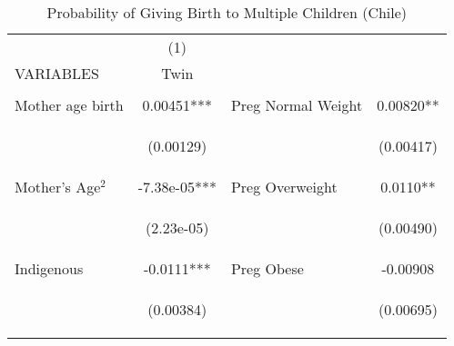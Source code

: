 \begin{table}[htpb!]							
\caption{Probability of Giving Birth to Multiple Children (Chile)}							
\label{tab:twinreg2}							
\begin{center}							
\begin{tabular}{lclc} \toprule							
	&	(1)	&		&		\\
VARIABLES	&	Twin	&		&		\\ \midrule
\vspace{4pt} & \begin{footnotesize}\end{footnotesize} & \begin{footnotesize}\end{footnotesize} & \begin{footnotesize}\end{footnotesize} \\							
Mother age birth	&	0.00451***	&	Preg Normal Weight	&	0.00820**	\\
	\vspace{4pt} & \begin{footnotesize}	(0.00129)	\end{footnotesize} & \begin{footnotesize}		\end{footnotesize} & \begin{footnotesize}	(0.00417)	\end{footnotesize} \\
Mother's Age$^2$	&	-7.38e-05***	&	Preg Overweight	&	0.0110**	\\
	\vspace{4pt} & \begin{footnotesize}	(2.23e-05)	\end{footnotesize} & \begin{footnotesize}		\end{footnotesize} & \begin{footnotesize}	(0.00490)	\end{footnotesize} \\
Indigenous	&	-0.0111***	&	Preg Obese	&	-0.00908	\\
	\vspace{4pt} & \begin{footnotesize}	(0.00384)	\end{footnotesize} & \begin{footnotesize}		\end{footnotesize} & \begin{footnotesize}	(0.00695)	\end{footnotesize} \\

\end{tabular}
\end{center}
\end{table}
